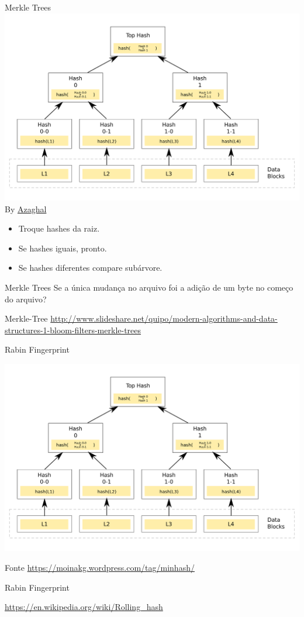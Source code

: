 \begin{frame}{Merkle Trees}
	\includegraphics[width=.7\textwidth]{./images/merkle_tree.png} By \href{https://commons.wikimedia.org/w/index.php?curid=18157888}{Azaghal} 

\begin{itemize}
	\item Troque hashes da raiz.
	\item Se hashes iguais, pronto.
	\item Se hashes diferentes \pause compare subárvore.
\end{itemize}
\end{frame}




\begin{frame}{Merkle Trees}
Se a única mudança no arquivo foi a adição de um byte no começo do arquivo?
\end{frame}

\begin{frame}{Merkle-Tree}
\url{http://www.slideshare.net/quipo/modern-algorithms-and-data-structures-1-bloom-filters-merkle-trees}	
\end{frame}


\begin{frame}{Rabin Fingerprint}

\includegraphics[width=.7\textwidth]{./images/merkle_tree.png}

Fonte \url{https://moinakg.wordpress.com/tag/minhash/} 
\end{frame}


\begin{frame}{Rabin Fingerprint}
	
	
\url{https://en.wikipedia.org/wiki/Rolling_hash}
\end{frame}
